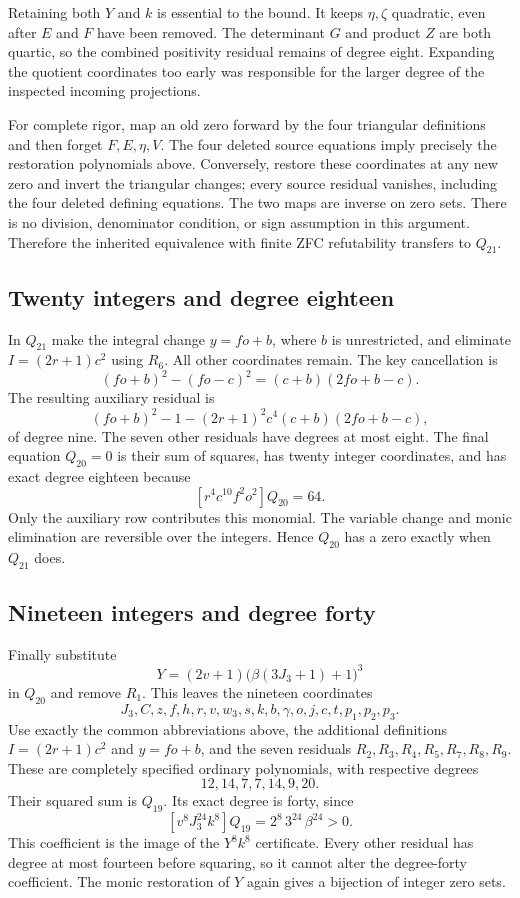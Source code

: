 Retaining both $Y$ and $k$ is essential to the bound. It keeps
$\eta,\zeta$ quadratic, even after $E$ and $F$ have been removed.
The determinant $G$ and product $Z$ are both quartic, so the combined
positivity residual remains of degree eight. Expanding the quotient
coordinates too early was responsible for the larger degree of the
inspected incoming projections.

For complete rigor, map an old zero forward by the four triangular
definitions and then forget $F,E,\eta,V$. The four deleted source
equations imply precisely the restoration polynomials above. Conversely,
restore these coordinates at any new zero and invert the triangular
changes; every source residual vanishes, including the four deleted
defining equations. The two maps are inverse on zero sets. There is
no division, denominator condition, or sign assumption in this argument.
Therefore the inherited equivalence with finite ZFC refutability transfers
to $Q_{21}$.

\subsection{Twenty integers and degree eighteen}

In $Q_{21}$ make the integral change $y=fo+b$, where $b$ is unrestricted,
and eliminate $I=(2r+1)c^2$ using $R_6$. All other coordinates remain.
The key cancellation is
\[
 (fo+b)^2-(fo-c)^2=(c+b)(2fo+b-c).
\]
The resulting auxiliary residual is
\[
 (fo+b)^2-1-(2r+1)^2c^4(c+b)(2fo+b-c),
\]
of degree nine. The seven other residuals have degrees at most eight.
The final equation $Q_{20}=0$ is their sum of squares, has twenty integer
coordinates, and has exact degree eighteen because
\[
 [r^4c^{10}f^2o^2]Q_{20}=64.
\]
Only the auxiliary row contributes this monomial. The variable change and
monic elimination are reversible over the integers. Hence $Q_{20}$ has a
zero exactly when $Q_{21}$ does.

\subsection{Nineteen integers and degree forty}

Finally substitute
\[
 Y=(2v+1)\bigl(\beta(3J_3+1)+1\bigr)^3
\]
in $Q_{20}$ and remove $R_1$. This leaves the nineteen coordinates
\[
 J_3,C,z,f,h,r,v,w_3,s,k,b,\gamma,o,j,c,t,p_1,p_2,p_3.
\]
Use exactly the common abbreviations above, the additional definitions
$I=(2r+1)c^2$ and $y=fo+b$, and the seven residuals
$R_2,R_3,R_4,R_5,R_7,R_8,R_9$. These are completely specified ordinary
polynomials, with respective degrees
\[
 12,14,7,7,14,9,20.
\]
Their squared sum is $Q_{19}$. Its exact degree is forty, since
\[
 [v^8J_3^{24}k^8]Q_{19}=2^8\,3^{24}\,\beta^{24}>0.
\]
This coefficient is the image of the $Y^8k^8$ certificate. Every other
residual has degree at most fourteen before squaring, so it cannot alter
the degree-forty coefficient. The monic restoration of $Y$ again gives a
bijection of integer zero sets.


